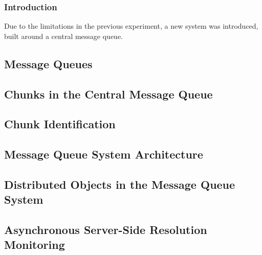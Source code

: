 \subsubsection{Introduction}\label{mqintro}

Due to the limitations in the previous experiment, a new system was introduced, built around a central message queue.

\subsection{Message Queues}\label{central-message-queue}

\subsection{Chunks in the Central Message Queue}

\subsection{Chunk Identification}

\subsection{Message Queue System Architecture}\label{sec:mq-arch}

\subsection{Distributed Objects in the Message Queue System}

\subsection{Asynchronous Server-Side Resolution Monitoring}


